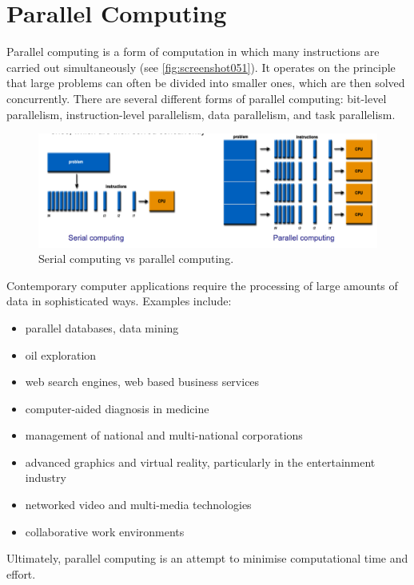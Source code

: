 \chapter{Parallel Computing}
Parallel computing is a form of computation in which many instructions are carried out simultaneously (see \autoref{fig:screenshot051}). It operates on the principle that large problems can often be divided into smaller ones, which are then solved concurrently. There are several different forms of parallel computing: bit-level parallelism, instruction-level parallelism, data parallelism, and task parallelism. 
\begin{figure}
\centering
\includegraphics[width=0.7\linewidth]{screenshot051}
\caption{Serial computing vs parallel computing.}
\label{fig:screenshot051}
\end{figure}

Contemporary computer applications require the processing of large amounts of data in sophisticated ways. Examples include:  \begin{itemize}
\item parallel databases, data mining  
\item oil exploration  
\item web search engines, web based business services  
\item computer-aided diagnosis in medicine  
\item management of national and multi-national corporations  
\item advanced graphics and virtual reality, particularly in the entertainment industry  
\item networked video and multi-media technologies  
\item collaborative work environments  
\end{itemize}
Ultimately, parallel computing is an attempt to minimise computational time and effort. 

